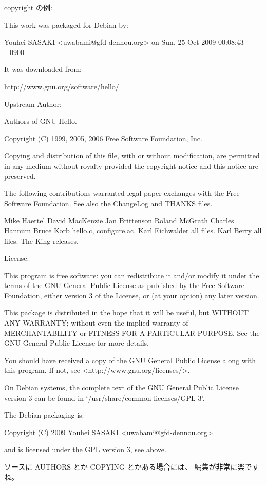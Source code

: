 \documentclass[mingoth,a4paper]{jsarticle}
\begin{document}
copyright の例:
\begin{commandline}
This work was packaged for Debian by:

    Youhei SASAKI <uwabami@gfd-dennou.org> on Sun, 25 Oct 2009 00:08:43 +0900

It was downloaded from:

    http://www.gnu.org/software/hello/

Upstream Author:

Authors of GNU Hello.

  Copyright (C) 1999, 2005, 2006 Free Software Foundation, Inc.

  Copying and distribution of this file, with or without modification,
  are permitted in any medium without royalty provided the copyright
  notice and this notice are preserved.

The following contributions warranted legal paper exchanges with the
Free Software Foundation.  See also the ChangeLog and THANKS files.

Mike Haertel
David MacKenzie
Jan Brittenson
Roland McGrath
Charles Hannum
Bruce Korb              hello.c, configure.ac.
Karl Eichwalder         all files.
Karl Berry              all files.
The King                releases.

License:

    This program is free software: you can redistribute it and/or modify
    it under the terms of the GNU General Public License as published by
    the Free Software Foundation, either version 3 of the License, or
    (at your option) any later version.

    This package is distributed in the hope that it will be useful,
    but WITHOUT ANY WARRANTY; without even the implied warranty of
    MERCHANTABILITY or FITNESS FOR A PARTICULAR PURPOSE.  See the
    GNU General Public License for more details.

    You should have received a copy of the GNU General Public License
    along with this program.  If not, see <http://www.gnu.org/licenses/>.

On Debian systems, the complete text of the GNU General
Public License version 3 can be found in `/usr/share/common-licenses/GPL-3'.

The Debian packaging is:

    Copyright (C) 2009 Youhei SASAKI <uwabami@gfd-dennou.org>

and is licensed under the GPL version 3, see above.
\end{commandline}
ソースに AUTHORS とか COPYING とかある場合には、 編集が非常に楽ですね。
\end{document}
